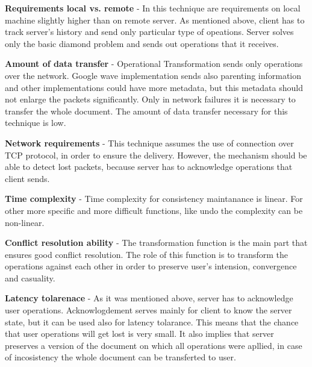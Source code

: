 \documentclass[12pt,oneside]{fithesis2}
\begin{document}
\vspace{3mm}

\textbf{Requirements local vs. remote} - In this technique are requirements on local machine slightly higher than on remote server. As mentioned above, client has to track server's history and send only particular type of opeations. Server solves only the basic diamond problem and sends out operations that it receives.

\vspace{3mm}

\textbf{Amount of data transfer} - Operational Transformation sends only operations over the network. Google wave implementation sends also parenting information and other implementations could have more metadata, but this metadata should not enlarge the packets significantly. Only in network failures it is necessary to transfer the whole document. The amount of data transfer necessary for this technique is low.

\vspace{3mm}

\textbf{Network requirements} - This technique assumes the use of connection over TCP protocol\cite{Jupiter}\cite{simplified}, in order to ensure the delivery. However, the mechanism should be able to detect lost packets, because server has to acknowledge operations that client sends. 

\vspace{3mm}

\textbf{Time complexity} - Time complexity for consistency maintanance is linear.\cite{sequence}\cite{orthogonal} For other more specific and more difficult functions, like undo the complexity can be non-linear.

\vspace{3mm}

\textbf{Conflict resolution ability} - The transformation function is the main part that ensures good conflict resolution. The role of this function is to transform the operations against each other in order to preserve user's intension, convergence and casuality.

\vspace{3mm}

\textbf{Latency tolarenace} - As it was mentioned above, server has to acknowledge user operations. Acknowlogdement serves mainly for client to know the server state, but it can be used also for latency tolarance. This means that the chance that user operations will get lost is very small. It also implies that server preserves a version of the document on which all operations were apllied, in case of incosistency the whole document can be transferted to user.
\end{document}
